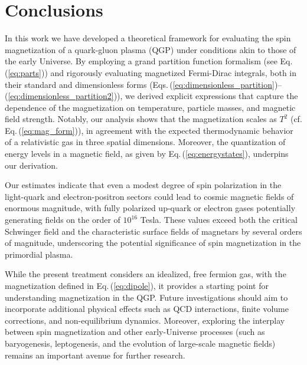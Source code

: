 \documentclass[epjST]{svjour}
\newcommand{\req}[1]{Eq.\,(\ref{#1})}
\numberwithin{equation}{section}
\begin{document}
\section{Conclusions}
\label{sec:conclusions}
In this work we have developed a theoretical framework for evaluating the spin magnetization of a quark-gluon plasma (QGP) under conditions akin to those of the early Universe. By employing a grand partition function formalism (see \req{eq:parts}) and rigorously evaluating magnetized Fermi-Dirac integrals, both in their standard and dimensionless forms (Eqs.\,(\ref{eq:dimensionless_partition})--(\ref{eq:dimensionless_partition2})), we derived explicit expressions that capture the dependence of the magnetization on temperature, particle masses, and magnetic field strength. Notably, our analysis shows that the magnetization scales as \(T^2\) (cf. \req{eq:mag_form}), in agreement with the expected thermodynamic behavior of a relativistic gas in three spatial dimensions. Moreover, the quantization of energy levels in a magnetic field, as given by \req{eq:energystates}, underpins our derivation.

Our estimates indicate that even a modest degree of spin polarization in the light-quark and electron-positron sectors could lead to cosmic magnetic fields of enormous magnitude, with fully polarized up-quark or electron gases potentially generating fields on the order of \(10^{16}\) Tesla. These values exceed both the critical Schwinger field and the characteristic surface fields of magnetars by several orders of magnitude, underscoring the potential significance of spin magnetization in the primordial plasma.

While the present treatment considers an idealized, free fermion gas, with the magnetization defined in \req{eq:dipole}, it provides a starting point for understanding magnetization in the QGP. Future investigations should aim to incorporate additional physical effects such as QCD interactions, finite volume corrections, and non-equilibrium dynamics. Moreover, exploring the interplay between spin magnetization and other early-Universe processes (such as baryogenesis, leptogenesis, and the evolution of large-scale magnetic fields) remains an important avenue for further research.

\end{document}
